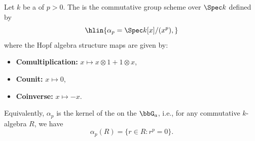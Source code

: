 \begin{definition} \label{definition:alpha_p_group_scheme}
    Let $k$ be a  of  $p > 0$. The  is the commutative group scheme over $\Spec k$ defined by
    $$\hlin{\alpha_p = \Spec k[x]/(x^p),}$$
    where the Hopf algebra structure maps are given by:
    \begin{itemize}
        \item \textbf{Comultiplication:} $x \mapsto x \otimes 1 + 1 \otimes x$,
        \item \textbf{Counit:} $x \mapsto 0$,
        \item \textbf{Coinverse:} $x \mapsto -x$.
    \end{itemize}
    Equivalently, $\alpha_p$ is the kernel of the  on the  $\bbG_a$, i.e., for any commutative $k$-algebra $R$, we have
    $$\alpha_p(R) = \{r \in R : r^p = 0\}.$$
\end{definition}
